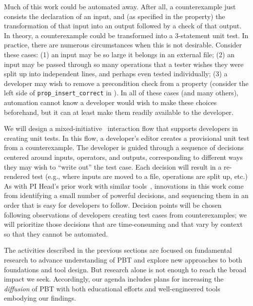 Much of this work could be automated away. After all, a counterexample just 
consists the declaration of an input, and (as specified in the property) the 
transformation of that input into an output followed by a check of that output.  
In theory, a counterexample could be transformed into a 3-statement unit test.  
In practice, there are numerous circumstances when this is not desirable.  
Consider these cases: (1) an input may be so large it belongs in an external 
file; (2) an input may be passed through so many operations that a tester wishes 
they were split up into independent lines, and perhaps even tested individually; 
(3) a developer may wish to remove a precondition check from a property 
(consider the left side of \texttt{prop\_insert\_correct} in 
).
In all of these cases (and many others), automation cannot know a developer would wish to make 
these choices beforehand, but it can at least make them readily available to the 
developer.

We will design a mixed-initiative~\cite{ref:allen1999mixed} interaction flow 
that supports developers in creating unit tests. In this flow, a developer's 
editor creates a provisional unit test from a counterexample. The developer is 
guided through a sequence of decisions centered around inputs, operators, and 
outputs, corresponding to different ways they may wish to ``write out'' the test 
case.  Each decision will result in a re-rendered test (e.g., where inputs are 
moved to a file, operations are split up, etc.)  As with PI Head's prior work 
with similar tools~\cite{ref:head2018interactive}, innovations in this work come 
from identifying a small number of powerful decisions, and sequencing them in an 
order that is easy for developers to follow.  Decision points will be chosen 
following observations of developers creating test cases from counterexamples; 
we will prioritize those decisions that are time-consuming and that vary by 
context so that they cannot be automated. 


The activities described in the previous sections are focused on
fundamental research to advance understanding of PBT and explore new
approaches to both foundations and tool design.  But research alone is
not enough to reach the broad impact we seek. Accordingly, our agenda
includes plans for increasing the {\em diffusion} of PBT with both
educational efforts and well-engineered tools
embodying our findings.

